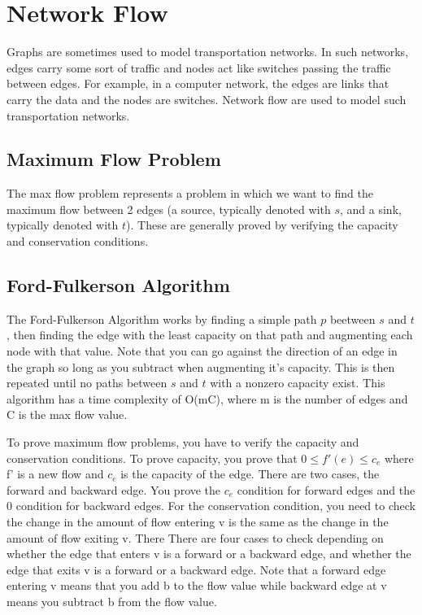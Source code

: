 \documentclass{article}
\begin{document}
\section{Network Flow}
Graphs are sometimes used to model transportation networks. In
such networks, edges carry some sort of traffic and nodes act like switches passing the
traffic between edges. For example, in a computer network, the edges are links that carry
the data and the nodes are switches. Network flow are used to model such transportation
networks.

\subsection{Maximum Flow Problem}
The max flow problem represents a problem in which we want to find the maximum flow between
2 edges (a source, typically denoted with $s$, and a sink, typically denoted with $t$). These
are generally proved by verifying the capacity and conservation conditions.

\subsection{Ford-Fulkerson Algorithm}
The Ford-Fulkerson Algorithm works by finding a simple path $p$ beetween $s$ and $t$, then finding
the edge with the least capacity on that path and augmenting each node with that value.
Note that you can go against the direction of an edge in the graph so long as you subtract when augmenting
it's capacity. This is then repeated until no paths between $s$ and $t$ with a nonzero capacity exist.
This algorithm has a time complexity of O(mC), where m is the number of edges and C is the max flow
value.


To prove maximum flow problems, you have to verify the capacity and conservation conditions. 
To prove capacity, you prove that $0 \leq f'(e) \leq c_e$ where f' is a new flow and $c_e$ is the 
capacity of the edge. There are two cases, the forward and backward edge. You prove the $c_e$ 
condition for forward edges and the 0
condition for backward edges. For the conservation condition, you need to check the change in 
the amount of flow entering v is the same as the change in the amount of flow exiting v. There 
There are four cases to check depending on whether the edge that enters v is a forward or a backward 
edge, and whether the edge that exits v is a forward or a backward 
edge. Note that a forward edge entering v means that you add b to the flow value while 
backward edge at v means you subtract b from the flow value.
\end{document}
